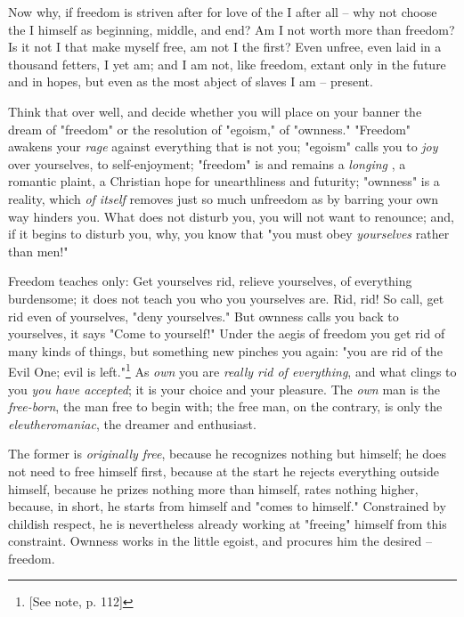 \documentclass[a4paper]{book}
\begin{document}
Now why, if freedom is striven after for love of the I after all -- why not 
choose the I himself as beginning, middle, and end? Am I not worth more than 
freedom? Is it not I that make myself free, am not I the first? Even unfree, 
even laid in a thousand fetters, I yet am; and I am not, like freedom, extant 
only in the future and in hopes, but even as the most abject of slaves I am -- 
present.

Think that over well, and decide whether you will place on your banner the 
dream of "{}freedom"{} or the resolution of "{}egoism,"{} of "{}ownness."{} 
"{}Freedom"{} awakens your \textit{rage} against everything that is not you; 
"{}egoism"{} calls you to \textit{joy} over yourselves, to self-enjoyment; 
"{}freedom"{} is and remains a \textit{longing} , a romantic plaint, a 
Christian hope for unearthliness and futurity; "{}ownness"{} is a reality, 
which \textit{of itself} removes just so much unfreedom as by barring your own 
way hinders you. What does not disturb you, you will not want to renounce; 
and, if it begins to disturb you, why, you know that "{}you must obey 
\textit{yourselves} rather than men!"{}

Freedom teaches only: Get yourselves rid, relieve yourselves, of everything 
burdensome; it does not teach you who you yourselves are. Rid, rid! So call, 
get rid even of yourselves, "{}deny yourselves."{} But ownness calls you back 
to yourselves, it says "{}Come to yourself!"{} Under the aegis of freedom you 
get rid of many kinds of things, but something new pinches you again: "{}you 
are rid of the Evil One; evil is left."{}\footnote{[See note, p. 112]} As 
\textit{own} you are \textit{really rid of everything}, and what clings to you 
\textit{you have accepted}; it is your choice and your pleasure. The 
\textit{own} man is the \textit{free-born}, the man free to begin with; the 
free man, on the contrary, is only the \textit{eleutheromaniac}, the dreamer 
and enthusiast.

The former is \textit{originally free}, because he recognizes nothing but 
himself; he does not need to free himself first, because at the start he 
rejects everything outside himself, because he prizes nothing more than 
himself, rates nothing higher, because, in short, he starts from himself and 
"{}comes to himself."{} Constrained by childish respect, he is nevertheless 
already working at "{}freeing"{} himself from this constraint. Ownness works 
in the little egoist, and procures him the desired -- freedom.
\end{document}
